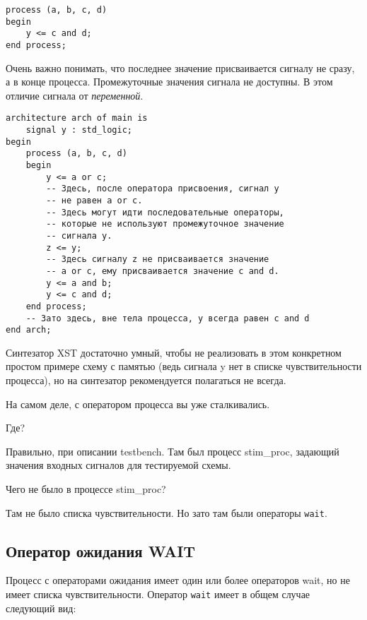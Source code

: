 \begin{Code}
\begin{lstlisting}
process (a, b, c, d)
begin
    y <= c and d;
end process;
\end{lstlisting}
\end{Code}

Очень важно понимать, что последнее значение присваивается сигналу не сразу, а в конце процесса. Промежуточные значения сигнала не доступны. В этом отличие сигнала от \emph{переменной}.

\begin{Code}
\begin{lstlisting}
architecture arch of main is
    signal y : std_logic;
begin
    process (a, b, c, d)
    begin
        y <= a or c;
        -- Здесь, после оператора присвоения, сигнал y 
        -- не равен a or c.
        -- Здесь могут идти последовательные операторы, 
        -- которые не используют промежуточное значение
        -- сигнала y.
        z <= y;
        -- Здесь сигналу z не присваивается значение  
        -- a or c, ему присваивается значение c and d.
        y <= a and b;
        y <= c and d;
    end process;
    -- Зато здесь, вне тела процесса, y всегда равен c and d
end arch;
\end{lstlisting}
\end{Code}

 Синтезатор XST достаточно умный, чтобы не реализовать в этом конкретном простом примере схему с памятью (ведь сигнала y нет в списке чувствительности процесса), но на синтезатор рекомендуется полагаться не всегда.

На самом деле, с оператором процесса вы уже сталкивались.

 Где?

 Правильно, при описании testbench. Там был процесс stim\_proc, задающий значения входных сигналов для тестируемой схемы.

 Чего не было в процессе stim\_proc?

 Там не было списка чувствительности. Но зато там были операторы \lstinline?wait?.

\subsection{Оператор ожидания WAIT}

Процесс с операторами ожидания имеет один или более операторов wait, но не имеет списка чувствительности. Оператор \lstinline?wait? имеет в общем случае следующий вид:

